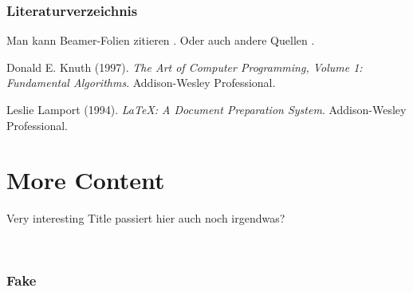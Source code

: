 \documentclass[12pt, aspectratio=169]{beamer}
\begin{document}
\begin{frame}[allowframebreaks] %
    \frametitle{Literaturverzeichnis}
    
    Man kann Beamer-Folien zitieren \cite{Knuth97}.
    Oder auch andere Quellen \cite{Lamport94}.
    
    \vspace{1em}
    
    \begin{thebibliography}{99} %
    
        Donald E. Knuth (1997).
        \textit{The Art of Computer Programming, Volume 1: Fundamental Algorithms}.
        Addison-Wesley Professional.
        
        Leslie Lamport (1994).
        \textit{\LaTeX: A Document Preparation System}.
        Addison-Wesley Professional.
    
    \end{thebibliography}
\end{frame}

\section{More Content}
\begin{frame}{Very interesting Title}
passiert hier auch noch irgendwas?
    
\end{frame}

\begin{frame}
    \frametitle{Fake}
    
\end{frame}
\end{document}
